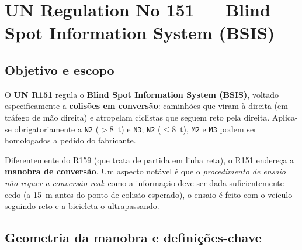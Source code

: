 \documentclass[11pt,a4paper]{article}
\begin{document}
\clearpage
\section{UN Regulation No 151 --- Blind Spot Information System (BSIS)}

\subsection{Objetivo e escopo}

O \textbf{UN R151} regula o \textbf{Blind Spot Information System (BSIS)},
voltado especificamente a \textbf{colisões em conversão}: caminhões que viram à
direita (em tráfego de mão direita) e atropelam ciclistas que seguem reto pela
direita. Aplica-se obrigatoriamente a \texttt{N2} ($>8$~t) e \texttt{N3};
\texttt{N2} ($\leq 8$~t), \texttt{M2} e \texttt{M3} podem ser homologados a
pedido do fabricante.

Diferentemente do R159 (que trata de partida em linha reta), o R151 endereça a
\textbf{manobra de conversão}. Um aspecto notável é que o \emph{procedimento de
ensaio não requer a conversão real}: como a informação deve ser dada
suficientemente cedo (a 15~m antes do ponto de colisão esperado), o ensaio é
feito com o veículo seguindo reto e a bicicleta o ultrapassando.

\subsection{Geometria da manobra e definições-chave}
\end{document}
